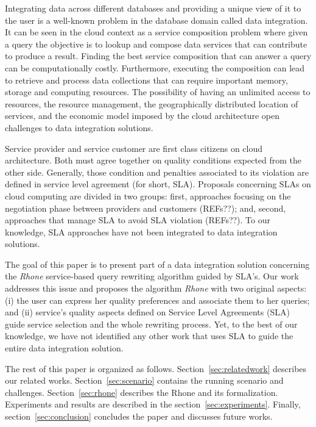 Integrating data across different databases and providing a unique view of it to the user is a well-known problem in the database domain called data integration.
It can be seen in the cloud context as a service composition problem where given a query the objective is to lookup and compose data services that can contribute to produce a result. 
Finding the best service composition that can answer a query can be computationally costly. 
Furthermore, executing the composition can lead to retrieve and process data collections that can require important memory, storage and computing resources.
The possibility of having an unlimited access to resources, the resource management, the geographically distributed location of services, and the economic model imposed by the cloud architecture open challenges to data integration solutions.

Service provider and service customer are first class citizens on cloud architecture.
Both must agree together on quality conditions expected from the other side. 
Generally, those condition and penalties associated to its violation are defined in service level 
agreement (for short, SLA). 
Proposals concerning SLAs on cloud computing are divided in two groups: first, approaches focusing on the negotiation phase between providers and customers (REFs??); and, second, approaches that manage SLA to avoid SLA violation (REFs??).
To our knowledge, SLA approaches have not been integrated to data integration solutions.

The goal of this paper is to present part of a data integration solution concerning the \textit{Rhone} service-based query rewriting algorithm guided by SLA's. 
Our work addresses this issue and proposes the algorithm \textit{Rhone} with two original aspects: (i) the user can express her quality preferences and associate them to her queries; and (ii)  service's quality aspects defined on Service Level Agreements (SLA) guide service selection and the whole rewriting process.
Yet, to the best of our knowledge, we have not identified any other work that uses SLA to guide the entire data integration solution.

The rest of this paper is organized as follows. 
Section~\ref{sec:relatedwork} describes our related works. 
Section~\ref{sec:scenario} contains the running scenario and challenges.
Section~\ref{sec:rhone} describes the Rhone and its formalization. 
Experiments and results are described in the section~\ref{sec:experiments}. 
Finally, section~\ref{sec:conclusion} concludes the paper and discusses future works.
